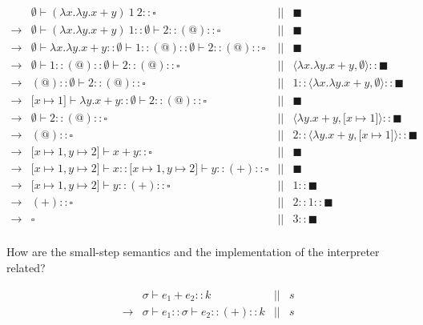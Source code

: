 \[
\begin{array}{lrcr}
& \emptyset\vdash(\lambda x.\lambda y.x+y)\ 1\ 2::\square &||& \blacksquare \\
\rightarrow & \emptyset\vdash(\lambda x.\lambda y.x+y)\
1::\emptyset\vdash2::(@)::\square &||&     \blacksquare \\
\rightarrow & \emptyset\vdash\lambda x.\lambda y.x+y::\emptyset\vdash
1::(@)::\emptyset\vdash2::(@ )::\square &||& \blacksquare \\
\rightarrow & \emptyset\vdash 1::(@)::\emptyset\vdash2::(@)::\square &||&
\langle\lambda x.\lambda y.x+y,\emptyset\rangle::\blacksquare \\
\rightarrow & (@)::\emptyset\vdash2::(@)::\square &||& 1::\langle\lambda
x.\lambda y.x+y,          \emptyset\rangle::\blacksquare \\
\rightarrow & \lbrack x\mapsto 1\rbrack\vdash\lambda
y.x+y::\emptyset\vdash2::(@)::\square &||&    \blacksquare \\
\rightarrow & \emptyset\vdash2::(@)::\square &||& \langle\lambda y.x+y,\lbrack
x\mapsto            1\rbrack\rangle::\blacksquare \\
\rightarrow & (@)::\square &||& 2::\langle\lambda y.x+y,\lbrack x\mapsto
1\rbrack\rangle::         \blacksquare \\
\rightarrow & \lbrack x\mapsto 1,y\mapsto 2\rbrack\vdash x+y::\square &||&
\blacksquare \\
\rightarrow & \lbrack x\mapsto 1,y\mapsto 2\rbrack\vdash x::\lbrack x\mapsto
1,y\mapsto            2\rbrack\vdash y::(+)::\square &||& \blacksquare \\
\rightarrow & \lbrack x\mapsto 1,y\mapsto 2\rbrack\vdash y::(+)::\square &||&
1::\blacksquare \\
\rightarrow & (+)::\square &||& 2::1::\blacksquare \\
\rightarrow & \square &||& 3::\blacksquare \\
\end{array}
\]

How are the small-step semantics and the implementation of the interpreter
related?

\[
\begin{array}{lrcr}
&\sigma\vdash e_1+e_2::k& ||& s\\
\rightarrow& \sigma\vdash e_1::\sigma\vdash e_2::(+)::k& ||& s\\
\end{array}
\]

